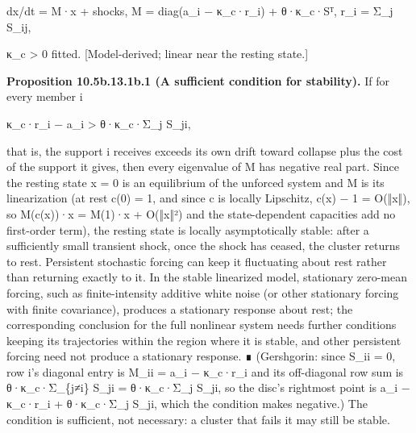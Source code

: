 \documentclass[
]{article}
\begin{document}
dx/dt = M·x + shocks, M = diag(a\_i − κ\_c·r\_i) + θ·κ\_c·Sᵀ, r\_i =
Σ\_j S\_ij,

κ\_c \textgreater{} 0 fitted. {[}Model-derived; linear near the resting
state.{]}

\textbf{Proposition 10.5b.13.1b.1 (A sufficient condition for
stability).} If for every member i

κ\_c·r\_i − a\_i \textgreater{} θ·κ\_c·Σ\_j S\_ji,

that is, the support i receives exceeds its own drift toward collapse
plus the cost of the support it gives, then every eigenvalue of M has
negative real part. Since the resting state x = 0 is an equilibrium of
the unforced system and M is its linearization (at rest c(0) = 1, and
since c is locally Lipschitz, c(x) − 1 = O(‖x‖), so M(c(x))·x = M(1)·x +
O(‖x‖²) and the state-dependent capacities add no first-order term), the
resting state is locally asymptotically stable: after a sufficiently
small transient shock, once the shock has ceased, the cluster returns to
rest. Persistent stochastic forcing can keep it fluctuating about rest
rather than returning exactly to it. In the stable linearized model,
stationary zero-mean forcing, such as finite-intensity additive white
noise (or other stationary forcing with finite covariance), produces a
stationary response about rest; the corresponding conclusion for the
full nonlinear system needs further conditions keeping its trajectories
within the region where it is stable, and other persistent forcing need
not produce a stationary response. ∎ (Gershgorin: since S\_ii = 0, row
i's diagonal entry is M\_ii = a\_i − κ\_c·r\_i and its off-diagonal row
sum is θ·κ\_c·Σ\_\{j≠i\} S\_ji = θ·κ\_c·Σ\_j S\_ji, so the disc's
rightmost point is a\_i − κ\_c·r\_i + θ·κ\_c·Σ\_j S\_ji, which the
condition makes negative.) The condition is sufficient, not necessary: a
cluster that fails it may still be stable.
\end{document}
